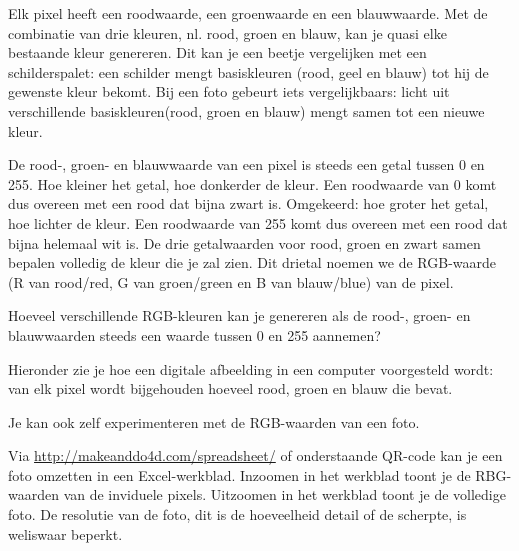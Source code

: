 
Elk pixel heeft een roodwaarde, een groenwaarde en een blauwwaarde. Met de combinatie van drie kleuren, nl. rood, groen en blauw, kan je quasi elke bestaande kleur genereren. Dit kan je een beetje vergelijken met een schilderspalet: een schilder mengt basiskleuren (rood, geel en blauw) tot hij de gewenste kleur bekomt. Bij een foto gebeurt iets vergelijkbaars: licht uit verschillende basiskleuren(rood, groen en blauw) mengt samen tot een nieuwe kleur.

De rood-, groen- en blauwwaarde van een pixel is steeds een getal tussen 0 en 255. Hoe kleiner het getal, hoe donkerder de kleur. Een roodwaarde van 0 komt dus overeen met een rood dat bijna zwart is. Omgekeerd: hoe groter het getal, hoe lichter de kleur. Een roodwaarde van 255 komt dus overeen met een rood dat bijna helemaal wit is. De drie getalwaarden voor rood, groen en zwart samen bepalen volledig de kleur die je zal zien. Dit drietal noemen we de RGB-waarde (R van rood/red, G van groen/green en B van blauw/blue) van de pixel.

\begin{oef}
	Hoeveel verschillende RGB-kleuren kan je genereren als de rood-, groen- en blauwwaarden steeds een waarde tussen 0 en 255 aannemen? 
\end{oef}

Hieronder zie je hoe een digitale afbeelding in een computer voorgesteld wordt: van elk pixel wordt bijgehouden hoeveel rood, groen en blauw die bevat. 


Je kan ook zelf experimenteren met de RGB-waarden van een foto. 

Via \url{http://makeanddo4d.com/spreadsheet/} of onderstaande QR-code kan je een foto omzetten in een Excel-werkblad. Inzoomen in het werkblad toont je de RBG-waarden van de inviduele pixels. Uitzoomen in het werkblad toont je de volledige foto. De resolutie van de foto, dit is de hoeveelheid detail of de scherpte, is weliswaar beperkt.



